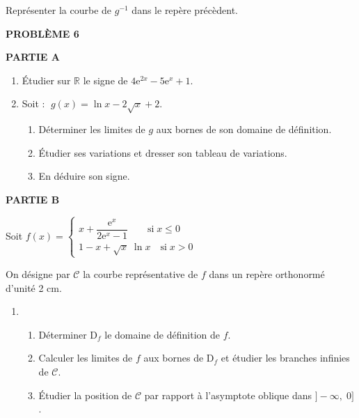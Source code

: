 \begin{enumerate}
\begin{enumerate}
\begin{enumerate}
Représenter la courbe de $ g^{-1} $ dans le repère précèdent.

 \end{enumerate}
  \end{enumerate}
  \vspace*{1cm}
  
  \textbf{PROBLÈME 6}
  \medskip
  
 \textbf{PARTIE A}   
\begin{enumerate}
 \item Étudier sur $ \mathbb{R} $ le signe  de\; $ 4\text{e}^{2x} -5\text{e}^{x}+1$.
 \item 
Soit  : \;  $\; g(x)=\ln x-2\sqrt{x}+2$.

\begin{enumerate}
 \item Déterminer  les limites de $ g $ aux bornes de son  domaine de définition.
  
  \item Étudier ses variations et dresser son tableau de variations.
  
\item En déduire son signe.
\end{enumerate} 
\end{enumerate}

 

\textbf{ PARTIE B}   
 
\medskip

Soit 
 $f(x)=\left \{\begin{array}{l} x+\dfrac{\text{e}^{x}}{2\text{e}^{x}-1}\qquad  \text{si} \; x\leq 0 \\[0.5cm] 1-x+\sqrt{x}\; \ln x \quad  \text{si}\; x >0 
 \end{array}\right.$

\medskip
  On désigne par $\mathscr{C}$
 la courbe représentative de $ f $ dans un repère orthonormé d'unité 2 cm.
 \begin{enumerate}
 \item
 \begin{enumerate}
  \item Déterminer D$_{f} $ le domaine de définition de $ f $.
  \item Calculer les limites de $ f $ aux bornes de D$_{f} $ et étudier les branches infinies de $\mathscr{C}$.
 
  \item Étudier la position de $\mathscr{C}$ par rapport à l'asymptote oblique  dans $ ]-\infty, \; 0]$.

   \end{enumerate}
   

\end{enumerate}
\end{enumerate}
